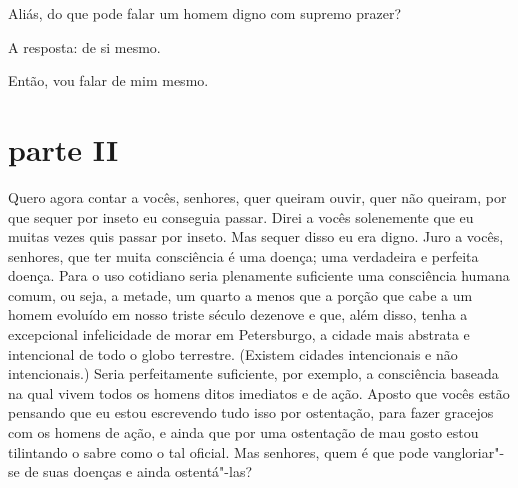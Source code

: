 Aliás, do que pode falar um homem digno com supremo prazer?

A resposta: de si mesmo.

Então, vou falar de mim mesmo.


\section{parte II}

Quero agora contar a vocês, senhores, quer queiram ouvir, quer não
queiram, por que sequer por inseto eu conseguia passar. Direi a vocês
solenemente que eu muitas vezes quis passar por inseto. Mas sequer
disso eu era digno. Juro a vocês, senhores, que ter muita consciência é
uma doença; uma verdadeira e perfeita doença. Para o uso cotidiano
seria plenamente suficiente uma consciência humana comum, ou seja, a
metade, um quarto a menos que a porção que cabe a um homem evoluído em
nosso triste século dezenove e que, além disso, tenha a excepcional
infelicidade de morar em Petersburgo, a cidade mais abstrata e
intencional de todo o globo terrestre. (Existem cidades intencionais e
não intencionais.) Seria perfeitamente suficiente, por exemplo, a
consciência baseada na qual vivem todos os homens ditos imediatos e de
ação. Aposto que vocês estão pensando que eu estou escrevendo tudo isso
por ostentação, para fazer gracejos com os homens de ação, e ainda que
por uma ostentação de mau gosto estou tilintando o sabre como o tal
oficial. Mas senhores, quem é que pode vangloriar"-se de suas doenças e
ainda ostentá"-las?


